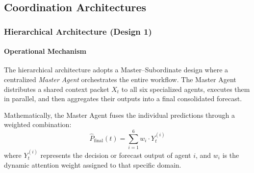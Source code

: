 \documentclass{ieeeaccess}
\begin{document}
\begin{table}[h!]
\centering
\caption{Operational Characteristics and Execution Behavior of Leading Large Language Models.}
\label{tab:llm_comparison_summary_en}
\end{table}

\subsection{Coordination Architectures}
\subsubsection{Hierarchical Architecture (Design 1)}

\paragraph{Operational Mechanism}
The hierarchical architecture adopts a Master--Subordinate design where a centralized \textit{Master Agent} orchestrates the entire workflow. The Master Agent distributes a shared context packet $X_t$ to all six specialized agents, executes them in parallel, and then aggregates their outputs into a final consolidated forecast.

Mathematically, the Master Agent fuses the individual predictions through a weighted combination:
\begin{equation}
\hat{P}_{\text{final}}(t) = \sum_{i=1}^{6} w_i \cdot Y_t^{(i)}
\label{eq:hierarchical_fusion}
\end{equation}
where $Y_t^{(i)}$ represents the decision or forecast output of agent $i$, and $w_i$ is the dynamic attention weight assigned to that specific domain.
\end{document}
